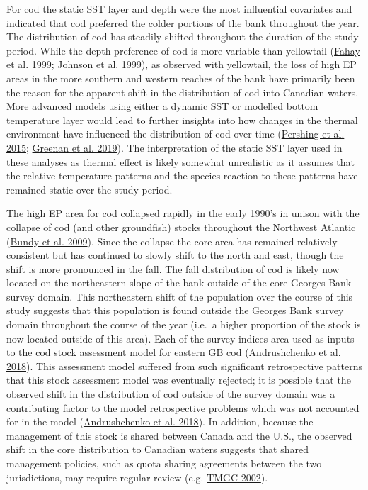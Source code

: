 \documentclass[
]{article}
\begin{document}
For cod the static SST layer and depth were the most influential covariates and indicated that cod preferred the colder portions of the bank throughout the year. The distribution of cod has steadily shifted throughout the duration of the study period. While the depth preference of cod is more variable than yellowtail (\protect\hyperlink{ref-fahayAtlanticCodGadus1999}{Fahay et al. 1999}; \protect\hyperlink{ref-johnsonYellowtailFlounderLimanda1999}{Johnson et al. 1999}), as observed with yellowtail, the loss of high EP areas in the more southern and western reaches of the bank have primarily been the reason for the apparent shift in the distribution of cod into Canadian waters. More advanced models using either a dynamic SST or modelled bottom temperature layer would lead to further insights into how changes in the thermal environment have influenced the distribution of cod over time (\protect\hyperlink{ref-pershingSlowAdaptationFace2015}{Pershing et al. 2015}; \protect\hyperlink{ref-greenanClimateChangeVulnerability2019}{Greenan et al. 2019}). The interpretation of the static SST layer used in these analyses as thermal effect is likely somewhat unrealistic as it assumes that the relative temperature patterns and the species reaction to these patterns have remained static over the study period.

The high EP area for cod collapsed rapidly in the early 1990's in unison with the collapse of cod (and other groundfish) stocks throughout the Northwest Atlantic (\protect\hyperlink{ref-bundySealsCodForage2009}{Bundy et al. 2009}). Since the collapse the core area has remained relatively consistent but has continued to slowly shift to the north and east, though the shift is more pronounced in the fall. The fall distribution of cod is likely now located on the northeastern slope of the bank outside of the core Georges Bank survey domain. This northeastern shift of the population over the course of this study suggests that this population is found outside the Georges Bank survey domain throughout the course of the year (i.e.~a higher proportion of the stock is now located outside of this area). Each of the survey indices area used as inputs to the cod stock assessment model for eastern GB cod (\protect\hyperlink{ref-andrushchenkoAssessmentEasternGeorges2018}{Andrushchenko et al. 2018}). This assessment model suffered from such significant retrospective patterns that this stock assessment model was eventually rejected; it is possible that the observed shift in the distribution of cod outside of the survey domain was a contributing factor to the model retrospective problems which was not accounted for in the model (\protect\hyperlink{ref-andrushchenkoAssessmentEasternGeorges2018}{Andrushchenko et al. 2018}). In addition, because the management of this stock is shared between Canada and the U.S., the observed shift in the core distribution to Canadian waters suggests that shared management policies, such as quota sharing agreements between the two jurisdictions, may require regular review (e.g. \protect\hyperlink{ref-tmgcDevelopmentSharingAllocation2002}{TMGC 2002}).
\end{document}

